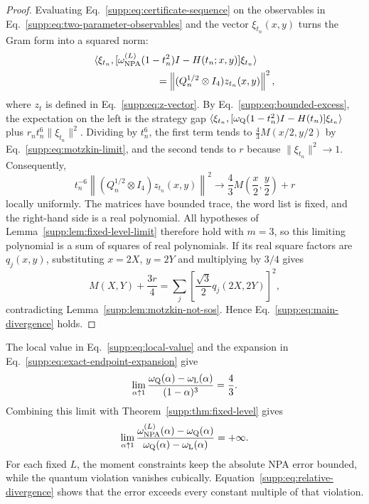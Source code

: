 \documentclass[aps,prl,onecolumn,10pt,superscriptaddress,nofootinbib,longbibliography]{revtex4-2}
\theoremstyle{remark}
\begin{document}
\begin{proof}
Evaluating Eq.~\eqref{supp:eq:certificate-sequence} on the observables in Eq.~\eqref{supp:eq:two-parameter-observables} and the vector $\xi_{t_n}(x,y)$ turns the Gram form into a squared norm:
\begin{align}
&\langle\xi_{t_n},
[\omega_{\rm NPA}^{(L)}(1-t_n^2)I-H(t_n;x,y)]\xi_{t_n}\rangle
\nonumber\\
&\hspace{22mm}
=\left\|(Q_n^{1/2}\otimes I_4)z_{t_n}(x,y)\right\|^2,
\label{supp:eq:evaluated-certificate}
\end{align}
where $z_t$ is defined in Eq.~\eqref{supp:eq:z-vector}. By Eq.~\eqref{supp:eq:bounded-excess}, the expectation on the left is the strategy gap $\langle\xi_{t_n},[\omega_{\rm Q}(1-t_n^2)I-H(t_n)]\xi_{t_n}\rangle$ plus $r_nt_n^6\|\xi_{t_n}\|^2$. Dividing by $t_n^6$, the first term tends to $\frac43M(x/2,y/2)$ by Eq.~\eqref{supp:eq:motzkin-limit}, and the second tends to $r$ because $\|\xi_{t_n}\|^2\to1$. Consequently,
\begin{equation}
t_n^{-6}
\left\|(Q_n^{1/2}\otimes I_4)z_{t_n}(x,y)\right\|^2
\longrightarrow
\frac43M\!\left(\frac{x}{2},\frac{y}{2}\right)+r
\label{supp:eq:certificate-limit}
\end{equation}
locally uniformly. The matrices have bounded trace, the word list is fixed, and the right-hand side is a real polynomial. All hypotheses of Lemma~\ref{supp:lem:fixed-level-limit} therefore hold with $m=3$, so this limiting polynomial is a sum of squares of real polynomials. If its real square factors are $q_j(x,y)$, substituting $x=2X$, $y=2Y$ and multiplying by $3/4$ gives
\begin{equation}
M(X,Y)+\frac{3r}{4}
=\sum_j\left[\frac{\sqrt3}{2}q_j(2X,2Y)\right]^2,
\label{supp:eq:forbidden-SOS}
\end{equation}
contradicting Lemma~\ref{supp:lem:motzkin-not-sos}. Hence Eq.~\eqref{supp:eq:main-divergence} holds.
\end{proof}

The local value in Eq.~\eqref{supp:eq:local-value} and the expansion in Eq.~\eqref{supp:eq:exact-endpoint-expansion} give
\begin{equation}
\lim_{\alpha\uparrow1}
\frac{\omega_{\rm Q}(\alpha)-\omega_{\rm L}(\alpha)}{(1-\alpha)^3}
=\frac43.
\label{supp:eq:quantum-advantage}
\end{equation}
Combining this limit with Theorem~\ref{supp:thm:fixed-level} gives
\begin{equation}
\lim_{\alpha\uparrow1}
\frac{\omega_{\rm NPA}^{(L)}(\alpha)-\omega_{\rm Q}(\alpha)}
{\omega_{\rm Q}(\alpha)-\omega_{\rm L}(\alpha)}
=+\infty.
\label{supp:eq:relative-divergence}
\end{equation}
For each fixed $L$, the moment constraints keep the absolute NPA error bounded, while the quantum violation vanishes cubically. Equation~\eqref{supp:eq:relative-divergence} shows that the error exceeds every constant multiple of that violation.
\end{document}
